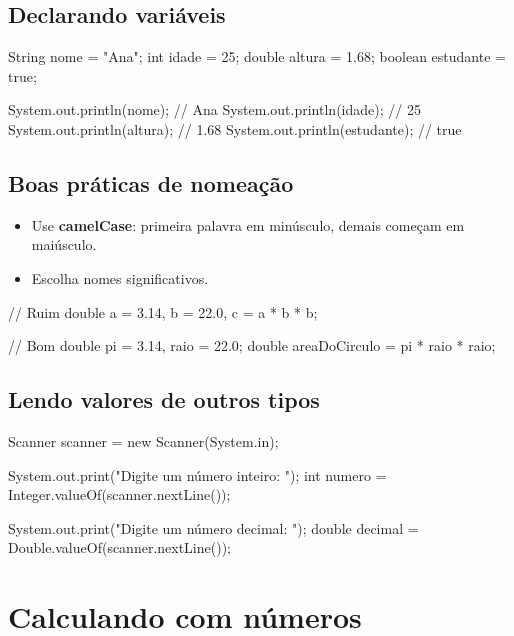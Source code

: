 \documentclass[11pt,a4paper]{article}
\begin{document}
\subsection{Declarando variáveis}

\begin{javacode}
String nome = "Ana";
int idade = 25;
double altura = 1.68;
boolean estudante = true;

System.out.println(nome);      // Ana
System.out.println(idade);     // 25
System.out.println(altura);    // 1.68
System.out.println(estudante); // true
\end{javacode}

\subsection{Boas práticas de nomeação}

\begin{itemize}
  \item Use \textbf{camelCase}: primeira palavra em minúsculo, demais começam em maiúsculo.
  \item Escolha nomes significativos.
\end{itemize}

\begin{javacode}
// Ruim
double a = 3.14, b = 22.0, c = a * b * b;

// Bom
double pi = 3.14, raio = 22.0;
double areaDoCirculo = pi * raio * raio;
\end{javacode}

\subsection{Lendo valores de outros tipos}

\begin{javacode}
Scanner scanner = new Scanner(System.in);

System.out.print("Digite um número inteiro: ");
int numero = Integer.valueOf(scanner.nextLine());

System.out.print("Digite um número decimal: ");
double decimal = Double.valueOf(scanner.nextLine());
\end{javacode}

\section{Calculando com números}
\end{document}
